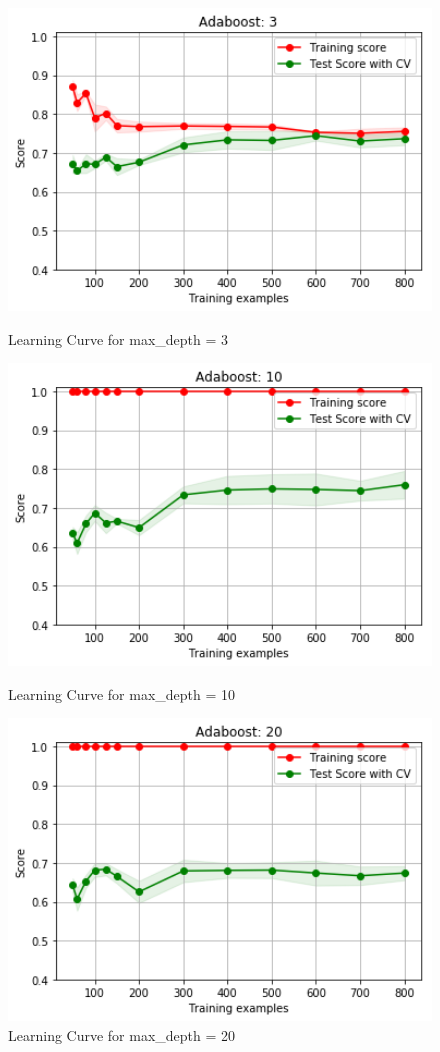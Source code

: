 \documentclass[h]{article}
\begin{document}
\begin{figure}[H]
      \includegraphics[width=1\textwidth,keepaspectratio]{2_curve_boost3.png} 
      \caption*{Learning Curve for max\_depth = 3} 
   \endminipage\hfill
      \includegraphics[width=1\textwidth,keepaspectratio]{2_curve_boost10.png} 
      \caption*{Learning Curve for max\_depth = 10} 
   \endminipage\hfill
      \includegraphics[width=1\textwidth,keepaspectratio]{2_curve_boost20.png} 
      \caption*{Learning Curve for max\_depth = 20} 
   \endminipage\hfill
\end{figure}
\end{document}
